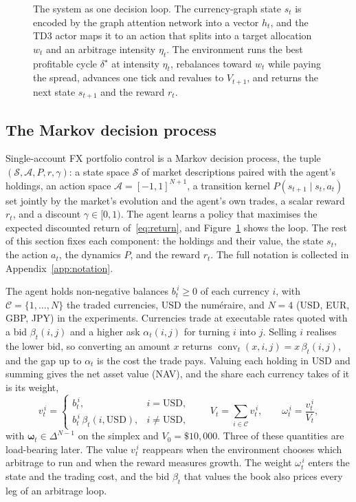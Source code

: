 \documentclass[12pt,a4paper]{article}
\begin{document}
\begin{figure}[t]
\caption{The system as one decision loop. The currency-graph state $s_t$ is encoded by the graph
attention network into a vector $h_t$, and the TD3 actor maps it to an action that splits into a
target allocation $w_t$ and an arbitrage intensity $\eta_t$. The environment runs the best
profitable cycle $\delta^\star$ at intensity $\eta_t$, rebalances toward $w_t$ while paying the
spread, advances one tick and revalues to $V_{t+1}$, and returns the next state $s_{t+1}$ and the
reward $r_t$.}
\label{fig:system}
\end{figure}

\subsection{The Markov decision process}

Single-account FX portfolio control is a Markov decision process, the tuple
$(\mathcal{S},\mathcal{A},P,r,\gamma)$: a state space $\mathcal{S}$ of market descriptions paired
with the agent's holdings, an action space $\mathcal{A}=[-1,1]^{N+1}$, a transition kernel
$P(s_{t+1}\mid s_t,a_t)$ set jointly by the market's evolution and the agent's own trades, a
scalar reward $r_t$, and a discount $\gamma\in[0,1)$. The agent learns a policy that maximises
the expected discounted return of~\eqref{eq:return}, and Figure~\ref{fig:system} shows the loop.
The rest of this section fixes each component: the holdings and their value, the state $s_t$,
the action $a_t$, the dynamics $P$, and the reward $r_t$. The full notation is collected in
Appendix~\ref{app:notation}.

The agent holds non-negative balances $b_t^{\,i}\ge 0$ of each currency $i$, with
$\mathcal{C}=\{1,\dots,N\}$ the traded currencies, USD the num\'eraire, and $N=4$
(USD, EUR, GBP, JPY) in the experiments. Currencies trade at executable rates quoted with a bid
$\beta_t(i,j)$ and a higher ask $\alpha_t(i,j)$ for turning $i$ into $j$. Selling $i$ realises
the lower bid, so converting an amount $x$ returns $\operatorname{conv}_t(x,i,j)=x\,\beta_t(i,j)$,
and the gap up to $\alpha_t$ is the cost the trade pays. Valuing each holding in USD and summing
gives the net asset value (NAV), and the share each currency takes of it is its weight,
\begin{equation}
v_t^{\,i}=\begin{cases} b_t^{\,i}, & i=\text{USD},\\ b_t^{\,i}\,\beta_t(i,\text{USD}), & i\neq\text{USD},\end{cases}
\qquad V_t=\sum_{i\in\mathcal{C}} v_t^{\,i},\qquad \omega_t^{\,i}=\frac{v_t^{\,i}}{V_t},
\label{eq:nav}
\end{equation}
with $\boldsymbol{\omega}_t\in\Delta^{N-1}$ on the simplex and $V_0=\$10{,}000$. Three of these
quantities are load-bearing later. The value $v_t^{\,i}$ reappears when the environment chooses
which arbitrage to run and when the reward measures growth. The weight $\omega_t^{\,i}$ enters
the state and the trading cost, and the bid $\beta_t$ that values the book also prices every leg
of an arbitrage loop.
\end{document}

